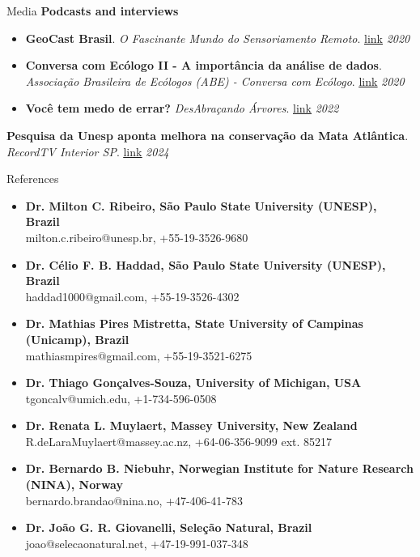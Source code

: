 \documentclass{resume}
\begin{document}
\begin{rSection}{Media}
{\bf Podcasts and interviews}
\begin{itemize} 
\item {\bf GeoCast Brasil}. {\it O Fascinante Mundo do Sensoriamento Remoto}. \href{https://open.spotify.com/episode/0Kn5k9039vM8bZgb4YdlJJ?si=S5hfhNc6S6GfDFaJSsaQDA}{\underline{link}} \hfill{\em 2020}
\item {\bf Conversa com Ecólogo II - A importância da análise de dados}. {\it Associação Brasileira de Ecólogos (ABE) - Conversa com Ecólogo}. \href{https://www.instagram.com/p/CFQVjMtH6qk/}{\underline{link}} \hfill{\em 2020}
\item {\bf Você tem medo de errar?} {\it DesAbraçando Árvores}. \href{https://www.desabrace.com.br/092-voce-tem-medo-de-errar/}{\underline{link}} \hfill{\em 2022} 
\end{itemize} 
\item {\bf Pesquisa da Unesp aponta melhora na conservação da Mata Atlântica}. {\it RecordTV Interior SP}. \href{https://recordtv.r7.com/recordtv-interior-sp/sp-record/pesquisa-da-unesp-aponta-melhora-na-conservacao-da-mata-atlantica-27032024?utm_source=link_direto&utm_medium=share-bar&utm_campaign=r7-topo}{\underline{link}} \hfill{\em 2024}
\end{rSection}


\begin{rSection}{References}
\begin{itemize}
\item {\bf Dr. Milton C. Ribeiro, São Paulo State University (UNESP), Brazil}\\
milton.c.ribeiro@unesp.br, +55-19-3526-9680
\item {\bf Dr. Célio F. B. Haddad, São Paulo State University (UNESP), Brazil}\\
haddad1000@gmail.com, +55-19-3526-4302
\item {\bf Dr. Mathias Pires Mistretta, State University of Campinas (Unicamp), Brazil}\\
mathiasmpires@gmail.com, +55-19-3521-6275
\item {\bf Dr. Thiago Gonçalves-Souza, University of Michigan, USA}\\
tgoncalv@umich.edu, +1-734-596-0508
\item {\bf Dr. Renata L. Muylaert, Massey University, New Zealand}\\
R.deLaraMuylaert@massey.ac.nz, +64-06-356-9099 ext. 85217
\item {\bf Dr. Bernardo B. Niebuhr, Norwegian Institute for Nature Research (NINA), Norway}\\
bernardo.brandao@nina.no, +47-406-41-783
\item {\bf Dr. João G. R. Giovanelli, Seleção Natural, Brazil}\\
joao@selecaonatural.net, +47-19-991-037-348
\end{itemize}
\end{rSection}
\end{document}
